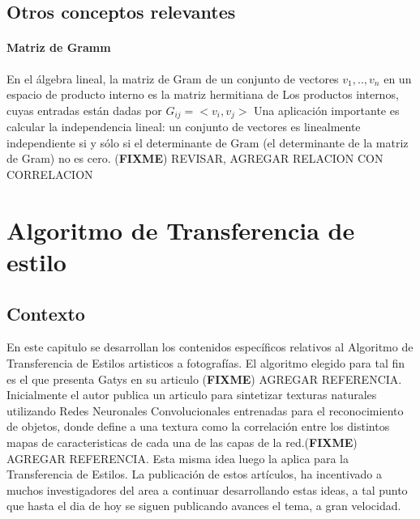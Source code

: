 \documentclass[a4paper,11pt,spanish]{book}
\newcommand*{\FIXME}[1]{{(\textbf{FIXME}) {#1}}}
\begin{document}
     \section {Otros conceptos relevantes}

	\subsubsection{Matriz de Gramm}
	  En el álgebra lineal, la matriz de Gram de un conjunto de vectores $v_{1}, .., v_{n} $ en un espacio de producto interno
	  es la matriz hermitiana de Los productos internos, cuyas entradas están dadas por $G_{ij} = <v_{i}, v_{j}>$
	  Una aplicación importante es calcular la independencia lineal: un conjunto de vectores es linealmente independiente si y sólo si el determinante de Gram
	  (el determinante de la matriz de Gram) no es cero.
	  \FIXME{REVISAR, AGREGAR RELACION CON CORRELACION}

\chapter{Algoritmo de Transferencia de estilo}

    \section{Contexto}
      En este capitulo se desarrollan los contenidos específicos relativos al Algoritmo de Transferencia de Estilos artisticos a fotografías. El algoritmo elegido para tal fin es el que
      presenta Gatys en su articulo \FIXME{AGREGAR REFERENCIA}.
      Inicialmente el autor publica un articulo para sintetizar texturas naturales utilizando Redes Neuronales Convolucionales entrenadas para el reconocimiento de objetos,
      donde define a una textura como la correlación entre los distintos mapas de caracteristicas de cada una de las capas de la red.\FIXME{AGREGAR REFERENCIA}.
      Esta misma idea luego la aplica para la Transferencia de Estilos.
      La publicación de estos artículos, ha incentivado a muchos investigadores del area a continuar desarrollando estas ideas, a tal punto que hasta el dia de hoy se siguen publicando
      avances el tema, a gran velocidad.
\end{document}
